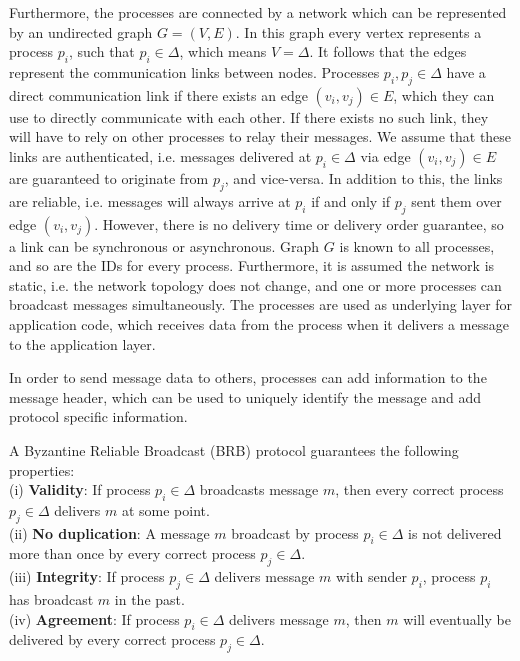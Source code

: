 Furthermore, the processes are connected by a network which can be represented by an undirected graph $G=(V,E)$. In this graph every vertex represents a process $p_i$, such that $p_i \in \Delta$, which means $V=\Delta$. It follows that the edges represent the communication links between nodes.
Processes $p_i, p_j \in \Delta$ have a direct communication link if there exists an edge $(v_i, v_j) \in E$, which they can use to directly communicate with each other. If there exists no such link, they will have to rely on other processes to relay their messages. We assume that these links are authenticated, i.e.\jd{,} messages delivered at $p_i \in \Delta$ via edge $(v_i, v_j) \in E$ are guaranteed to originate from $p_j$, and vice-versa. In addition to this, the links are reliable, i.e. messages will always arrive at $p_i$ if and only if $p_j$ sent them over edge $(v_i, v_j)$. However, there is no delivery time or delivery order guarantee, so a link can be synchronous or asynchronous. Graph $G$ is known to all processes, and so are the IDs for every process. Furthermore, it is assumed the network is static, i.e. the network topology does not change, and one or more processes can broadcast messages simultaneously. The processes are used as underlying layer for application code, which receives data from the process when it delivers a message to the application layer.

In order to send message data to others, processes can add information to the message header, which can be used to uniquely identify the message and add protocol specific information.

A Byzantine Reliable Broadcast (BRB) protocol guarantees the following properties:\\
(i) \textbf{Validity}: If process $p_i \in \Delta$ broadcasts message $m$, then every correct process $p_j \in \Delta$ delivers $m$ at some point.\\
(ii) \textbf{No duplication}: A message $m$ broadcast by process $p_i \in \Delta$ is not delivered more than once by every correct process $p_j \in \Delta$.\\
(iii) \textbf{Integrity}: If process $p_j \in \Delta$ delivers message $m$ with sender $p_i$, process $p_i$ has broadcast $m$ in the past.\\
(iv) \textbf{Agreement}: If process $p_i \in \Delta$ delivers message $m$, then $m$ will eventually be delivered by every correct process $p_j \in \Delta$.

